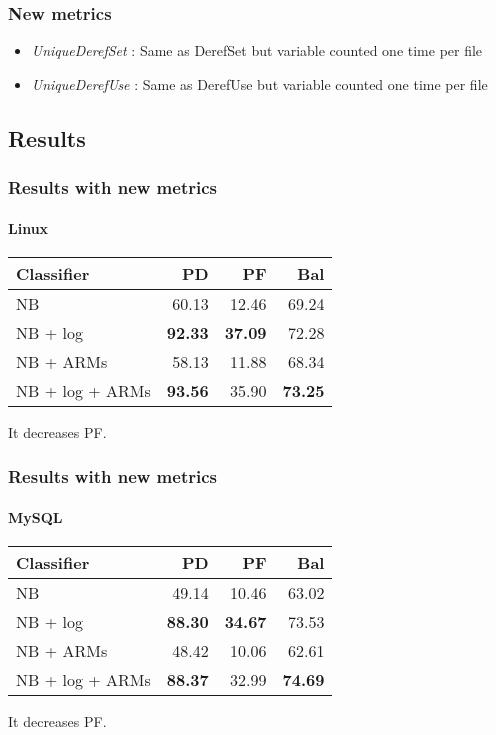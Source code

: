 \begin{frame}
 \frametitle{New metrics}
 \begin{itemize}
  \item \emph{UniqueDerefSet} : Same as DerefSet but variable counted one time per file
  \item \emph{UniqueDerefUse} : Same as DerefUse but variable counted one time per file
 \end{itemize}
 \vfill
\end{frame}

\subsection{Results}
\begin{frame}
 \frametitle{Results with new metrics}
 \framesubtitle{Linux}
 \begin{center}
 \begin{tabular}{lrrr}
  \hspace{0.2cm} Classifier & PD & PF & Bal\\
  \hline
  NB & 60.13 & 12.46 & 69.24\\
  NB + log &  \textbf{92.33} & \textbf{37.09} & 72.28\\
  NB + ARMs & 58.13 & 11.88 & 68.34\\
  NB + log + ARMs & \textbf{93.56} & 35.90 & \textbf{73.25}\\
  \hline
 \end{tabular}
 \end{center}
 \vspace{0.5cm}
 It decreases PF.
\end{frame}

\begin{frame}
 \frametitle{Results with new metrics}
 \framesubtitle{MySQL}
 \begin{center}
 \begin{tabular}{lrrr}
  \hspace{0.2cm} Classifier & PD & PF & Bal\\
  \hline
  NB & 49.14 & 10.46 & 63.02\\
  NB + log &  \textbf{88.30} & \textbf{34.67} & 73.53\\
  NB + ARMs & 48.42 & 10.06 & 62.61\\
  NB + log + ARMs & \textbf{88.37} & 32.99 & \textbf{74.69}\\
  \hline
 \end{tabular}
 \end{center}
 \vspace{0.5cm}
 It decreases PF.
\end{frame}

